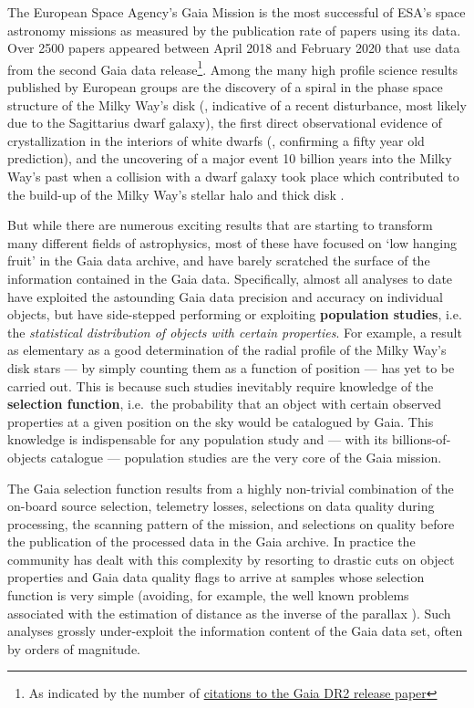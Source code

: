The European Space Agency's Gaia Mission \cite{2016A&A...595A...1G} is the most successful of ESA's space astronomy missions as measured by the publication rate of papers using its data. Over 2500 papers appeared between April 2018 and February 2020 that use data from the second Gaia data release\footnote{As indicated by the number of  \href{https://ui.adsabs.harvard.edu/search/q=citations(bibcode\%3A2018A\%26A...616A...1G)&sort=date\%20desc\%2C\%20bibcode\%20desc&p_=0}{citations to the Gaia DR2 release paper}}. Among the many high profile science results published by European groups are the discovery of a spiral in the phase space structure of the Milky Way's disk (\cite{Antoja2018a}, indicative of a recent disturbance, most likely due to the Sagittarius dwarf galaxy), the first direct observational evidence of crystallization in the interiors of white dwarfs (\cite{2019Natur.565..202T}, confirming a fifty year old prediction), and the uncovering of a major event 10 billion years into the Milky Way's past when a collision with a dwarf galaxy took place which contributed to the build-up of the Milky Way's stellar halo and thick disk \cite{2018Natur.563...85H, 2018MNRAS.478..611B, 2019arXiv190904679B}. 

But while there are numerous exciting results that are starting to transform many different fields of astrophysics, most of these have focused on `low hanging fruit' in the Gaia data archive, and have barely scratched the surface of the information contained in the Gaia data. Specifically, almost all analyses to date have exploited the astounding Gaia data precision and accuracy on individual objects, but have side-stepped performing or exploiting \textbf{population studies}, i.e. the \textsl{statistical distribution of objects with certain properties}. For example, a result as elementary as a good determination of the radial profile of the Milky Way's disk stars --- by simply counting them as a function of position --- has yet to be carried out. This is because such studies inevitably require knowledge of the \textbf{selection function}, i.e.\ the probability that an object with certain observed properties at a given position on the sky would be catalogued by Gaia. This knowledge is indispensable for any population study and --- with its billions-of-objects catalogue --- population studies are the very core of the Gaia mission.

The Gaia selection function results from a highly non-trivial combination of the on-board source selection, telemetry losses, selections on data quality during processing, the scanning pattern of the mission, and selections on quality before the publication of the processed data in the Gaia archive. In practice the community has dealt with this complexity by resorting to drastic cuts on object properties and Gaia data quality flags to arrive at samples whose selection function is very simple (avoiding, for example, the well known problems associated with the estimation of distance as the inverse of the parallax \cite{2018A&A...616A...9L}). Such analyses grossly under-exploit the information content of the Gaia data set, often by orders of magnitude.

